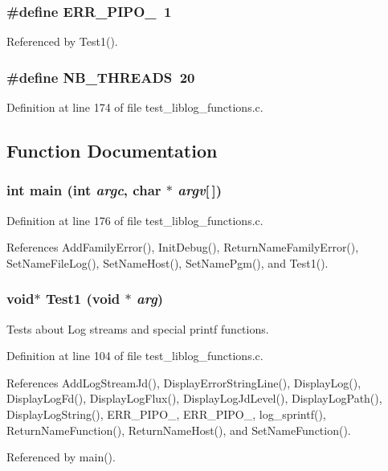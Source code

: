 \subsubsection{\setlength{\rightskip}{0pt plus 5cm}\#define ERR\_\-PIPO\_\ 1}\label{test__liblog__functions_8c_a1}




Referenced by Test1().
\subsubsection{\setlength{\rightskip}{0pt plus 5cm}\#define NB\_\-THREADS\ 20}\label{test__liblog__functions_8c_a2}




Definition at line 174 of file test\_\-liblog\_\-functions.c.

\subsection{Function Documentation}
\subsubsection{\setlength{\rightskip}{0pt plus 5cm}int main (int {\em argc}, char $\ast$ {\em argv}[$\,$])}\label{test__liblog__functions_8c_a6}




Definition at line 176 of file test\_\-liblog\_\-functions.c.

References Add\-Family\-Error(), Init\-Debug(), Return\-Name\-Family\-Error(), Set\-Name\-File\-Log(), Set\-Name\-Host(), Set\-Name\-Pgm(), and Test1().
\subsubsection{\setlength{\rightskip}{0pt plus 5cm}void$\ast$ Test1 (void $\ast$ {\em arg})}\label{test__liblog__functions_8c_a5}


Tests about Log streams and special printf functions. 

Definition at line 104 of file test\_\-liblog\_\-functions.c.

References Add\-Log\-Stream\-Jd(), Display\-Error\-String\-Line(), Display\-Log(), Display\-Log\-Fd(), Display\-Log\-Flux(), Display\-Log\-Jd\-Level(), Display\-Log\-Path(), Display\-Log\-String(), ERR\_\-PIPO\_, ERR\_\-PIPO\_, log\_\-sprintf(), Return\-Name\-Function(), Return\-Name\-Host(), and Set\-Name\-Function().

Referenced by main().